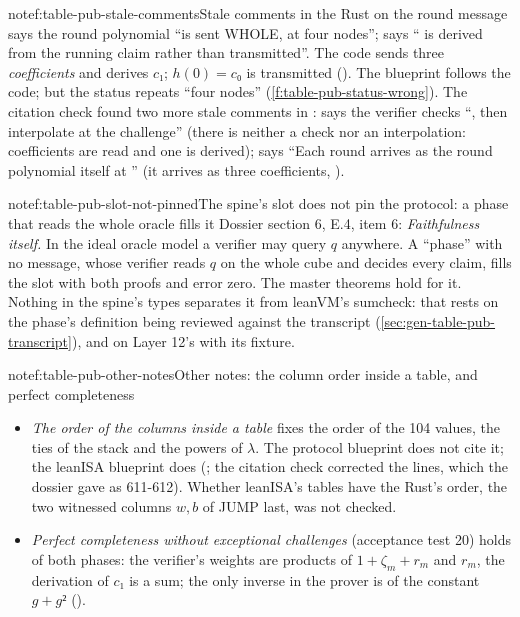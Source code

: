 \begin{finding}{note}{f:table-pub-stale-comments}{Stale comments in the Rust on the round message}
  says the round polynomial ``is sent WHOLE, at four
nodes'';  says `` is derived from the running claim rather than
transmitted''. The code sends three \emph{coefficients} and derives $c₁$; $h(0) = c₀$ is
transmitted (). The blueprint follows the code; but the status repeats
``four nodes'' (\cref{f:table-pub-status-wrong}). The citation check found two more stale comments
in :  says the verifier checks ``, then
interpolate at the challenge'' (there is neither a check nor an interpolation: coefficients are
read and one is derived);  says ``Each round arrives as the round polynomial
itself at '' (it arrives as three coefficients, ).
\end{finding}

\begin{finding}{note}{f:table-pub-slot-not-pinned}{The spine's slot does not pin the protocol: a phase that reads the whole oracle fills it}
 Dossier section 6, E.4, item 6: \emph{Faithfulness itself.} In the ideal oracle
model a verifier may query $q$ anywhere. A ``phase'' with no message, whose verifier reads $q$ on
the whole cube and decides every claim, fills the slot with both proofs and error zero. The master
theorems hold for it. Nothing in the spine's types separates it from leanVM's sumcheck: that
rests on the phase's definition being reviewed against the transcript
(\cref{sec:gen-table-pub-transcript}), and on Layer 12's  with its
fixture.
\end{finding}

\begin{finding}{note}{f:table-pub-other-notes}{Other notes: the column order inside a table, and perfect completeness}
\begin{itemize}
\item \emph{The order of the columns inside a table} fixes the order of the 104 values, the ties
  of the stack and the powers of $λ$. The protocol blueprint does not cite it; the leanISA
  blueprint does (; the citation check corrected
  the lines, which the dossier gave as 611-612). Whether leanISA's tables have the Rust's order,
  the two witnessed columns $w, b$ of JUMP last, was not checked.
\item \emph{Perfect completeness without exceptional challenges} (acceptance test 20) holds of
  both phases: the verifier's weights are products of $1 + ζ_m + r_m$ and $r_m$, the derivation
  of $c₁$ is a sum; the only inverse in the prover is of the constant $g + g²$
  ().
\end{itemize}
\end{finding}
